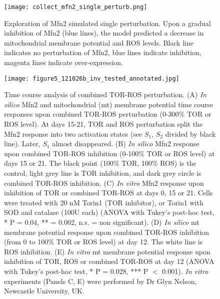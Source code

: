 \begin{figure}[tb]
	\begin{center}
		\texttt{[image: collect\_mfn2\_single\_perturb.png]}
		\caption[Exploration of Mfn2 simulated single perturbation]{Exploration of Mfn2 simulated single perturbation. Upon a gradual inhibition of Mfn2 (blue lines), the model predicted a decrease in mitochondrial membrane potential and ROS levels. Black line indicates no perturbation of Mfn2, blue lines indicate inhibition, magenta lines indicate over-expression.}
		\label{fig:project3_collect_mfn2_single_perturb}
	\end{center}
\end{figure}
\clearpage


\begin{figure}[tb]
	\begin{center}
		\texttt{[image: figure5\_121026b\_inv\_tested\_annotated.jpg]}
		\caption[Time course analysis of combined TOR-ROS perturbation]{Time course analysis of combined TOR-ROS perturbation. (A) \emph{In silico} Mfn2 and mitochondrial (mt) membrane potential time course responses upon combined TOR-ROS perturbation (0-300\% TOR or ROS level). At days 15-21, TOR and ROS perturbation split the Mfn2 response into two activation states (see $S_1$, $S_2$ divided by black line). Later, $S_1$ almost disappeared. (B) \emph{In silico} Mfn2 response upon combined TOR-ROS inhibition (0-100\% TOR or ROS level) at days 15 or 21. The black point (100\% TOR, 100\% ROS) is the control, light grey line is TOR inhibition, and dark grey circle is combined TOR-ROS inhibition. (C) \emph{In vitro} Mfn2 response upon inhibition of TOR or combined TOR-ROS at days 0, 15 or 21. Cells were treated with 20 nM Torin1 (TOR inhibitor), or Torin1 with SOD and catalase (100U each) (ANOVA with Tukey's post-hoc test, * P = 0.04, ** = 0.002, n.s. = non significant). (D) \emph{In silico} mt 
membrane potential response upon combined TOR-ROS inhibition (from 0 to 100\% TOR or ROS level) at day 12. The white line is ROS inhibition. (E) \emph{In vitro} mt membrane potential response upon inhibition of TOR, ROS or combined TOR-ROS at day 12 (ANOVA with Tukey's post-hoc test, * P = 0.028, *** P $<$ 0.001). \emph{In vitro} experiments (Panels C, E) were performed by Dr Glyn Nelson, Newcastle University, UK.}
		\label{fig:project3_figure5_121026}
	\end{center}
\end{figure}
\clearpage


